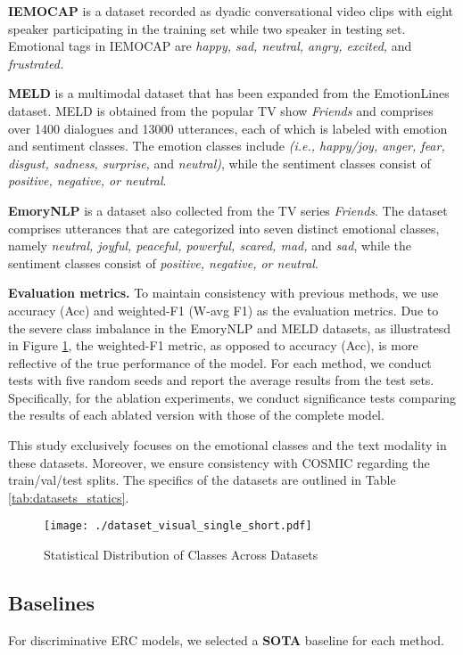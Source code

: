 \documentclass[conference]{IEEEtran}
\begin{document}
\textbf{IEMOCAP} \cite{busso2008iemocap} is a dataset recorded as dyadic conversational video clips with eight speaker participating in the training set while two speaker in testing set. Emotional tags in IEMOCAP are \textit{happy, sad, neutral, angry, excited,} and \textit{frustrated.} 

\textbf{MELD} \cite{poria2018meld} is a multimodal dataset that has been expanded from the EmotionLines dataset. MELD is obtained from the popular TV show \textit{Friends} and comprises over 1400 dialogues and 13000 utterances, each of which is labeled with emotion and sentiment classes. The emotion classes include \textit{(i.e., happy/joy, anger, fear, disgust, sadness, surprise,} and \textit{neutral)}, while the sentiment classes consist of \textit{positive, negative, or neutral}. 

\textbf{EmoryNLP} \cite{zahiri2017emotion} is a dataset also collected from the TV series \textit{Friends}. The dataset comprises utterances that are categorized into seven distinct emotional classes, namely \textit{neutral, joyful, peaceful, powerful, scared, mad,} and \textit{sad}, while the sentiment classes consist of \textit{positive, negative, or neutral}.

\textbf{Evaluation metrics.} To maintain consistency with previous methods, we use accuracy (Acc) and weighted-F1 (W-avg F1) as the evaluation metrics. Due to the severe class imbalance in the EmoryNLP and MELD datasets, as illustratesd in Figure \ref{fig:dataset_short}, the weighted-F1 metric, as opposed to accuracy (Acc), is more reflective of the true performance of the model.
For each method, we conduct tests with five random seeds and report the average results from the test sets. Specifically, for the ablation experiments, we conduct significance tests comparing the results of each ablated version with those of the complete model.

This study exclusively focuses on the emotional classes and the text modality in these datasets. Moreover, we ensure consistency with COSMIC regarding the train/val/test splits. The specifics of the datasets are outlined in Table \ref{tab:datasets_statics}.

\begin{figure}
    \centering
    \texttt{[image: ./dataset\_visual\_single\_short.pdf]}
    \caption{Statistical Distribution of Classes Across Datasets}
    \label{fig:dataset_short}
\end{figure}


\subsection{Baselines}
For discriminative ERC models, we selected a \textbf{SOTA} baseline for each method. 
\end{document}
